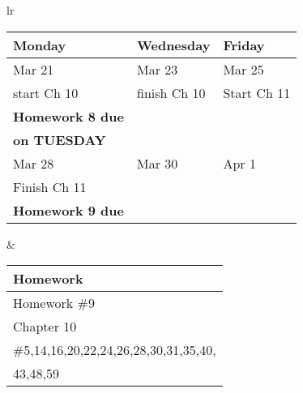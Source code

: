 \documentclass[11pt]{article}
\begin{document}
\newpage
\begin{tabular}{lr}
\begin{tabular}{|l|l|l|}
\hline
Monday & Wednesday & Friday \\
\hline \hline
Mar 21&Mar 23 & Mar 25\\
start Ch 10&finish Ch 10&Start Ch 11\\
\textbf{Homework 8 due}&&\\
\textbf{on TUESDAY}&&\\
\hline
Mar 28 & Mar 30 & Apr 1 \\
Finish Ch 11 &&\\
\textbf{Homework 9 due}&&\\
\hline
\end{tabular}
&
\begin{tabular}{|p{6cm}|}
\hline
Homework \\
\hline \hline
Homework \#9\\
Chapter 10\\
\#5,14,16,20,22,24,26,28,30,31,35,40,\\
43,48,59\\
\hline
\end{tabular}
\end{tabular}
\end{document}
